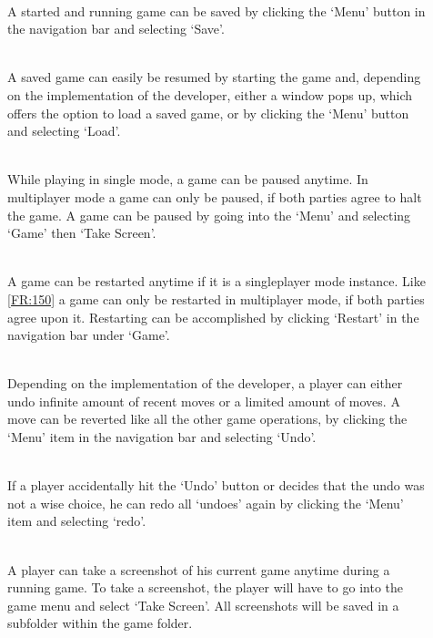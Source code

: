 \begin{description}
  	\item[] \textbf{}  \\
  	A started and running game can be saved by clicking the `Menu' button in the navigation bar and selecting `Save'.
 	\item[] \textbf{}  \\
 	A saved game can easily be resumed by starting the game and, depending on the implementation of the developer, either a window pops up, which offers the option to load a saved game, or by clicking the `Menu' button and selecting `Load'.
	\item[] \textbf{}  \\
	While playing in single mode, a game can be paused anytime. In multiplayer mode a game can only be paused, if both parties agree to halt the game. A game can be paused by going into the `Menu' and selecting `Game' then `Take Screen'.
	\item[] \textbf{}  \\
	A game can be restarted anytime if it is a singleplayer mode instance. Like \ref{FR:150} a game can only be restarted in multiplayer mode, if both parties agree upon it. Restarting can be accomplished by clicking `Restart' in the navigation bar under `Game'.
	\item[] \textbf{}  \\
	Depending on the implementation of the developer, a player can either \gls{undo} infinite amount of recent moves or a limited amount of moves. A move can be reverted like all the other game operations, by clicking the `Menu' item in the navigation bar and selecting `Undo'.
	\item[] \textbf{} \\
	If a player accidentally hit the `Undo' button or decides that the undo was not a wise choice, he can redo all `undoes' again by clicking the `Menu' item and selecting `\Gls{redo}'.
	\item[] \textbf{} \\
	A player can take a screenshot of his current game anytime during a running game. To take a screenshot, the player will have to go into the game menu and select `Take Screen'. All screenshots will be saved in a subfolder within the game folder.
\end{description}
